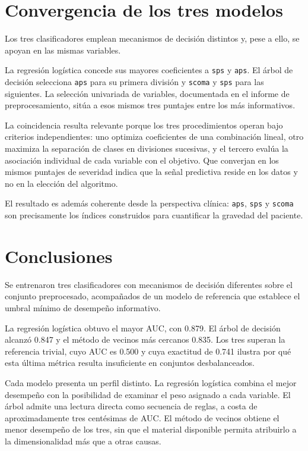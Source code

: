 \documentclass[11pt]{article}
\begin{document}
\section{Convergencia de los tres modelos}

Los tres clasificadores emplean mecanismos de decisión distintos y, pese a ello, se apoyan en las
mismas variables.

La regresión logística concede sus mayores coeficientes a \texttt{sps} y \texttt{aps}. El árbol de
decisión selecciona \texttt{aps} para su primera división y \texttt{scoma} y \texttt{sps} para las
siguientes. La selección univariada de variables, documentada en el informe de preprocesamiento,
sitúa a esos mismos tres puntajes entre los más informativos.

La coincidencia resulta relevante porque los tres procedimientos operan bajo criterios
independientes: uno optimiza coeficientes de una combinación lineal, otro maximiza la separación
de clases en divisiones sucesivas, y el tercero evalúa la asociación individual de cada variable
con el objetivo. Que converjan en los mismos puntajes de severidad indica que la señal predictiva
reside en los datos y no en la elección del algoritmo.

El resultado es además coherente desde la perspectiva clínica: \texttt{aps}, \texttt{sps} y
\texttt{scoma} son precisamente los índices construidos para cuantificar la gravedad del paciente.

\section{Conclusiones}

Se entrenaron tres clasificadores con mecanismos de decisión diferentes sobre el conjunto
preprocesado, acompañados de un modelo de referencia que establece el umbral mínimo de
desempeño informativo.

La regresión logística obtuvo el mayor AUC, con 0.879. El árbol de decisión alcanzó 0.847 y el
método de vecinos más cercanos 0.835. Los tres superan la referencia trivial, cuyo AUC es 0.500 y
cuya exactitud de 0.741 ilustra por qué esta última métrica resulta insuficiente en conjuntos
desbalanceados.

Cada modelo presenta un perfil distinto. La regresión logística combina el mejor desempeño con la
posibilidad de examinar el peso asignado a cada variable. El árbol admite una lectura directa como
secuencia de reglas, a costa de aproximadamente tres centésimas de AUC. El método de vecinos
obtiene el menor desempeño de los tres, sin que el material disponible permita atribuirlo a la
dimensionalidad más que a otras causas.
\end{document}
